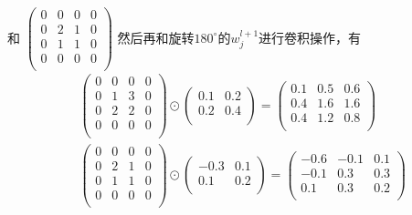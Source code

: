             和
            \begin{math}
            \left(
            \begin{smallmatrix}
            0 & 0 & 0 & 0\\
            0 & 2 & 1 & 0\\
            0 & 1 & 1 & 0\\
            0 & 0 & 0 & 0\\
            \end{smallmatrix}
            \right)
            \end{math}
            然后再和旋转$180^\circ$的$w_j^{l+1}$进行卷积操作，有
            \begin{align*}
            &
            \begin{pmatrix}
            0 & 0 & 0 & 0\\
            0 & 1 & 3 & 0\\
            0 & 2 & 2 & 0\\
            0 & 0 & 0 & 0\\
            \end{pmatrix}
            \odot
            \begin{pmatrix}
            0.1 & 0.2 \\
            0.2 & 0.4 \\
            \end{pmatrix}
            =
            \begin{pmatrix}
            0.1 & 0.5 & 0.6\\
            0.4 & 1.6 & 1.6\\
            0.4 & 1.2 & 0.8\\
            \end{pmatrix}\\
            &
            \begin{pmatrix}
            0 & 0 & 0 & 0\\
            0 & 2 & 1 & 0\\
            0 & 1 & 1 & 0\\
            0 & 0 & 0 & 0\\
            \end{pmatrix}
            \odot
            \begin{pmatrix}
            -0.3 & 0.1 \\
            0.1 & 0.2 \\
            \end{pmatrix}
            =
            \begin{pmatrix}
            -0.6 & -0.1 & 0.1\\
            -0.1 & 0.3 & 0.3\\
            0.1 & 0.3 & 0.2\\
            \end{pmatrix}
            \end{align*}
